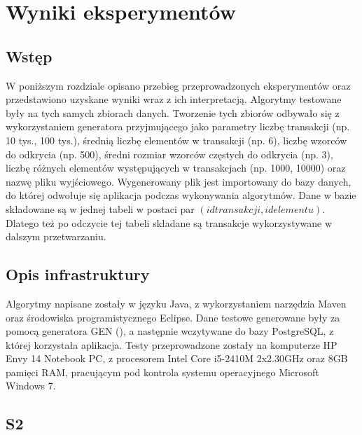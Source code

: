 \chapter{Wyniki eksperymentów}
\label{c5}

\section{Wstęp}
\label{c51}
W poniższym rozdziale opisano przebieg przeprowadzonych eksperymentów oraz przedstawiono uzyskane wyniki wraz z ich interpretacją. Algorytmy testowane były na tych samych zbiorach danych. Tworzenie tych zbiorów odbywało się z wykorzystaniem generatora przyjmującego jako parametry liczbę transakcji (np. 10 tys., 100 tys.), średnią liczbę elementów w transakcji (np. 6), liczbę wzorców do odkrycia (np. 500), średni rozmiar wzorców częstych do odkrycia (np. 3), liczbę różnych elementów występujących w transakcjach (np. 1000, 10000) oraz nazwę pliku wyjściowego. Wygenerowany plik jest importowany do bazy danych, do której odwołuje się aplikacja podczas wykonywania algorytmów. Dane w bazie składowane są w jednej tabeli w postaci par \((id transakcji, id elementu)\). Dlatego też po odczycie tej tabeli składane są transakcje wykorzystywane w dalszym przetwarzaniu. 

\section{Opis infrastruktury}
\label{c52}
Algorytmy napisane zostały w języku Java, z wykorzystaniem narzędzia Maven oraz środowiska programistycznego Eclipse. Dane testowe generowane były za pomocą generatora GEN (\cite{AgrawalGEN}), a następnie wczytywane do bazy PostgreSQL, z której korzystała aplikacja. Testy przeprowadzone zostały na komputerze HP Envy 14 Notebook PC, z procesorem Intel Core i5-2410M 2x2.30GHz oraz 8GB pamięci RAM, pracującym pod kontrola systemu operacyjnego Microsoft Windows 7. 

\section{S2}
\label{c53}

